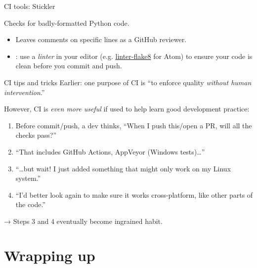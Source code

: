 \documentclass[12pt,aspectratio=169]{beamer}
\begin{document}
\begin{frame}{CI tools: Stickler}

{\Large Checks for badly-formatted Python code.}

\bigskip
\begin{itemize}
  \item Leaves comments on specific lines as a GitHub reviewer.
  \item {}: use a \emph{linter} in your editor (e.g. \href{https://atom.io/packages/linter-flake8}{\ttfamily linter-flake8} for Atom) to ensure your code is clean before you commit and push.
\end{itemize}

\end{frame}

\begin{frame}{CI tips and tricks}
Earlier: one purpose of CI is “to enforce quality \emph{without human intervention}.”

\bigskip
However, CI is \emph{even more useful} if used to help learn good development practice:
\begin{enumerate}
  \item Before commit/push, a dev thinks, “When I push this/open a PR, will all the checks pass?”
  \item “That includes GitHub Actions, AppVeyor (Windows tests)…”
  \item “…but wait! I just added something that might only work on my Linux system.”
  \item “I'd better look again to make sure it works cross-platform, like other parts of the code.”
\end{enumerate}

\bigskip
\hspace{2em} → Steps 3 and 4 eventually become ingrained habit.

\end{frame}

\section*{Wrapping up}
\end{document}
